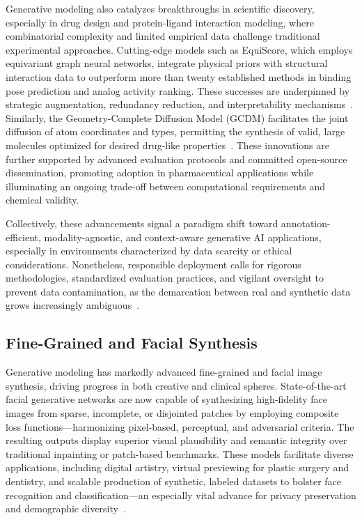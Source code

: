 \documentclass[sigconf]{acmart}
\begin{document}
Generative modeling also catalyzes breakthroughs in scientific discovery, especially in drug design and protein-ligand interaction modeling, where combinatorial complexity and limited empirical data challenge traditional experimental approaches. Cutting-edge models such as EquiScore, which employs equivariant graph neural networks, integrate physical priors with structural interaction data to outperform more than twenty established methods in binding pose prediction and analog activity ranking. These successes are underpinned by strategic augmentation, redundancy reduction, and interpretability mechanisms~\cite{ref59}. Similarly, the Geometry-Complete Diffusion Model (GCDM) facilitates the joint diffusion of atom coordinates and types, permitting the synthesis of valid, large molecules optimized for desired drug-like properties~\cite{ref74}. These innovations are further supported by advanced evaluation protocols and committed open-source dissemination, promoting adoption in pharmaceutical applications while illuminating an ongoing trade-off between computational requirements and chemical validity.

Collectively, these advancements signal a paradigm shift toward annotation-efficient, modality-agnostic, and context-aware generative AI applications, especially in environments characterized by data scarcity or ethical considerations. Nonetheless, responsible deployment calls for rigorous methodologies, standardized evaluation practices, and vigilant oversight to prevent data contamination, as the demarcation between real and synthetic data grows increasingly ambiguous~\cite{ref34,ref62,ref63,ref64,ref65,ref74,ref75,ref81,ref82,ref89,ref90}.

\subsection{Fine-Grained and Facial Synthesis}

Generative modeling has markedly advanced fine-grained and facial image synthesis, driving progress in both creative and clinical spheres. State-of-the-art facial generative networks are now capable of synthesizing high-fidelity face images from sparse, incomplete, or disjointed patches by employing composite loss functions—harmonizing pixel-based, perceptual, and adversarial criteria. The resulting outputs display superior visual plausibility and semantic integrity over traditional inpainting or patch-based benchmarks. These models facilitate diverse applications, including digital artistry, virtual previewing for plastic surgery and dentistry, and scalable production of synthetic, labeled datasets to bolster face recognition and classification—an especially vital advance for privacy preservation and demographic diversity~\cite{ref97}.
\end{document}
